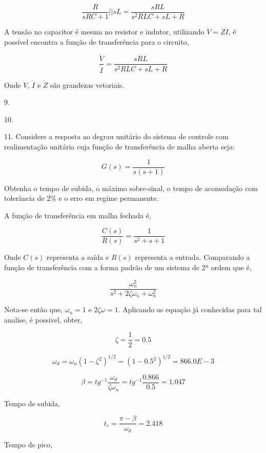 \documentclass[paper=a4, fontsize=11pt]{article}
\begin{document}
$$
\frac{R}{s R C + 1} || s L = \frac{s R L}{s^2 R L C + s L + R}
$$

A tensão no capacitor é mesma no resistor e indutor, utilizando $\dot{V}=\dot{Z}\dot{I}$,
é possível encontra a função de transferência para o circuito,

$$
\frac{\dot{V}}{\dot{I}} = \frac{s R L}{s^2 R L C + s L + R}
$$

Onde $\dot{V}$, $\dot{I}$ e $\dot{Z}$ são grandezas vetoriais.

\newpage

9.

\newpage

10.

\newpage

11. Considere a resposta ao degrau unitário do sistema de controle com realimentação 
unitária cuja função de transferência de malha aberta seja:

$$
G(s) = \frac{1}{s(s+1)}
$$

Obtenha o tempo de subida, o máximo sobre-sinal, o tempo de acomodação com tolerância de
$2\%$ e o erro em regime permanente.


A função de transferência em malha fechada é,

$$
\frac{C(s)}{R(s)} = \frac{1}{s^2 + s + 1}
$$

Onde $C(s)$ representa a saída e $R(s)$ representa a entrada. Comparando a função de 
transferência com a forma padrão de um sistema de 2ª ordem que é,

$$
\frac{\omega_n^2}{s^2 + 2 \zeta \omega_n + \omega_n^2}
$$

Nota-se então que, $\omega_n = 1$ e $2 \zeta \omega = 1$. Aplicando as equação já conhecidas
para tal analise, é possivel, obter,

$$
\zeta = \frac{1}{2} = 0.5
$$

$$
\omega_d = \omega_n (1-\zeta^2)^{1/2} = (1 - 0.5^2)^{1/2} = 866.0E-3
$$

$$
\beta = tg^{-1}{\frac{\omega_d}{\zeta \omega_n}} = tg^{-1}{\frac{0.866}{0.5}} = 1.047
$$

Tempo de subida,

$$
t_r = \frac{\pi - \beta}{\omega_d} = 2.418
$$

Tempo de pico,
\end{document}
